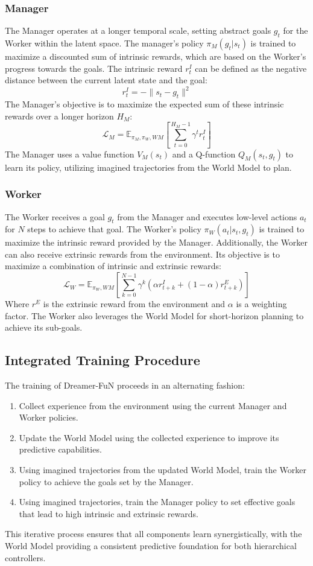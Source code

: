 \documentclass[conference]{IEEEtran}
\begin{document}
\subsubsection{Manager}
The Manager operates at a longer temporal scale, setting abstract goals \(g_t\) for the Worker within the latent space. The manager's policy \(\pi_M(g_t | s_t)\) is trained to maximize a discounted sum of intrinsic rewards, which are based on the Worker's progress towards the goals. The intrinsic reward \(r^I_t\) can be defined as the negative distance between the current latent state and the goal:
\[ r^I_t = -\|s_t - g_t\|^2 \]
The Manager's objective is to maximize the expected sum of these intrinsic rewards over a longer horizon \(H_M\):
\[ \mathcal{L}_M = \mathbb{E}_{\pi_M, \pi_W, WM} \left[ \sum_{t=0}^{H_M-1} \gamma^t r^I_t \right] \]
The Manager uses a value function \(V_M(s_t)\) and a Q-function \(Q_M(s_t, g_t)\) to learn its policy, utilizing imagined trajectories from the World Model to plan.

\subsubsection{Worker}
The Worker receives a goal \(g_t\) from the Manager and executes low-level actions \(a_t\) for \(N\) steps to achieve that goal. The Worker's policy \(\pi_W(a_t | s_t, g_t)\) is trained to maximize the intrinsic reward provided by the Manager. Additionally, the Worker can also receive extrinsic rewards from the environment. Its objective is to maximize a combination of intrinsic and extrinsic rewards:
\[ \mathcal{L}_W = \mathbb{E}_{\pi_W, WM} \left[ \sum_{k=0}^{N-1} \gamma^k (\alpha r^I_{t+k} + (1-\alpha) r^E_{t+k}) \right] \]
Where \(r^E\) is the extrinsic reward from the environment and \(\alpha\) is a weighting factor. The Worker also leverages the World Model for short-horizon planning to achieve its sub-goals.

\subsection{Integrated Training Procedure}
The training of Dreamer-FuN proceeds in an alternating fashion:
\begin{enumerate}
    \item Collect experience from the environment using the current Manager and Worker policies.
    \item Update the World Model using the collected experience to improve its predictive capabilities.
    \item Using imagined trajectories from the updated World Model, train the Worker policy to achieve the goals set by the Manager.
    \item Using imagined trajectories, train the Manager policy to set effective goals that lead to high intrinsic and extrinsic rewards.
\end{enumerate}
This iterative process ensures that all components learn synergistically, with the World Model providing a consistent predictive foundation for both hierarchical controllers.
\end{document}
